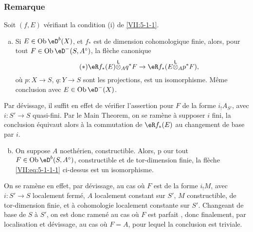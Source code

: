 \subsubsection{Remarque}\label{VII:5-1-2}

Soit $(f,E)$ vérifiant la condition (i) de \ref{VII:5-1-1}. 
\begin{enumerate}[a)]
  \item Si $E\in \ob \eD^b(X)$, et $f_\ast$ est de dimension cohomologique 
    finie, alors, pour tout $F\in \ob\eD^-(S,A^\circ)$, la flèche canonique 
    \begin{equation*}\tag{$*$}\label{VII:eq:5-1-1-1}
      \eR f_\ast(E)\lotimes_A q^\ast F \to \eR f_\ast(E\lotimes_A p^\ast F) \text{,} 
    \end{equation*}
    où $p:X\to S$, $q:Y\to S$ sont les projections, est un isomorphisme. 
    Même conclusion avec $E\in\ob\eD^-(X)$. 
\end{enumerate} 

Par dévissage, il suffit en effet de vérifier l'assertion pour $F$ de la 
forme $i_! A_{S'}$, avec $i:S'\to S$ quasi-fini. Par le Main Theorem, on se 
ramène à supposer $i$ fini, la conclusion équivaut alors à la 
commutation de $\eR f_\ast(E)$ au changement de base par $i$. 
\begin{enumerate}[a)]
\setcounter{enumi}{1}
  \item On suppose $A$ noethérien, constructible. Alors, p our tout 
    $F\in\ob\eD^b(S,A^\circ)$, constructible et de tor-dimension finie, la 
    flèche \eqref{VII:eq:5-1-1-1} ci-dessus est un isomorphisme. 
\end{enumerate}

On se ramène en effet, par dévissage, au cas où $F$ est de la forme 
$i_! M$, avec $i:S'\to S$ localement fermé, $A$ localement constant sur $S'$, 
$M$ constructible, de tor-dimension finie, et à cohomologie localement 
constante sur $S'$. Changeant de base de $S$ à $S'$, on est donc ramené au 
cas où $F$ est parfait \cite[I]{sga6}, donc finalement, par localisation et 
dévissage, au cas où $F=A$, pour lequel la conclusion est triviale. 





\subsubsection{}\label{VII:5-1-3}

